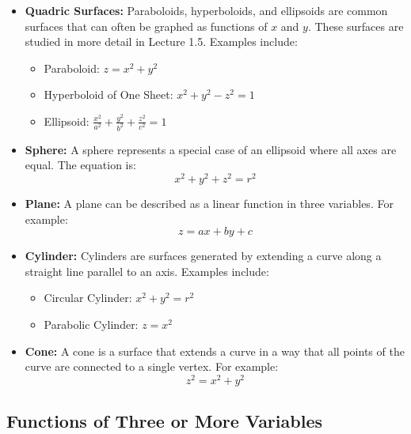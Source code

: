 \begin{itemize}
    \item \textbf{Quadric Surfaces:} Paraboloids, hyperboloids, and ellipsoids are common surfaces that can often be graphed as functions of \( x \) and \( y \). These surfaces are studied in more detail in Lecture 1.5. Examples include:
    \begin{itemize}
        \item Paraboloid: \( z = x^2 + y^2 \)
        \item Hyperboloid of One Sheet: \( x^2 + y^2 - z^2 = 1 \)
        \item Ellipsoid: \( \frac{x^2}{a^2} + \frac{y^2}{b^2} + \frac{z^2}{c^2} = 1 \)
    \end{itemize}
    
    \item \textbf{Sphere:} A sphere represents a special case of an ellipsoid where all axes are equal. The equation is: 
    \[
    x^2 + y^2 + z^2 = r^2
    \]
    
    \item \textbf{Plane:} A plane can be described as a linear function in three variables. For example:
    \[
    z = ax + by + c
    \]
    
    \item \textbf{Cylinder:} Cylinders are surfaces generated by extending a curve along a straight line parallel to an axis. Examples include:
    \begin{itemize}
        \item Circular Cylinder: \( x^2 + y^2 = r^2 \)
        \item Parabolic Cylinder: \( z = x^2 \)
    \end{itemize}
    
    \item \textbf{Cone:} A cone is a surface that extends a curve in a way that all points of the curve are connected to a single vertex. For example:
    \[
    z^2 = x^2 + y^2
    \]
\end{itemize}

\subsection*{Functions of Three or More Variables} 

